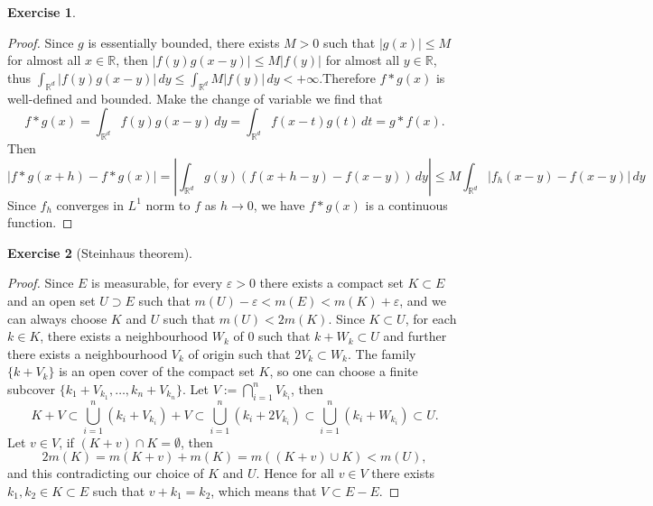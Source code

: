 \documentclass[a4paper]{article}
\newtheorem{ex}{Exercise}[subsection]
\begin{document}
\begin{ex}\end{ex}\begin{proof}
Since $g$ is essentially bounded, there exists $M > 0$ such that $|g(x)| \leq M$ for almost all $x \in \mathbb{R}$, 
then $|f(y)g(x - y)| \leq M|f(y)|$ for almost all $y \in \mathbb{R}$, thus $
\int_{\mathbb{R}^d}|f(y)g(x - y)|\,dy \leq \int_{\mathbb{R}^d}M|f(y)|\,dy < +\infty.
$Therefore $f * g(x)$ is well-defined and bounded. Make the change of variable we find that$$
f * g(x) = \int_{\mathbb{R}^d} f(y)g(x - y)\,dy = \int_{\mathbb{R}^d} f(x - t)g(t)\,dt = g * f(x).
$$Then$$
|f * g(x + h) - f * g(x)| = |\int_{\mathbb{R}^d}g(y)(f(x + h - y) - f(x - y))\,dy| \leq M\int_{\mathbb{R}^d}|f_h(x - y) - f(x - y)|\,dy
$$
Since $f_h$ converges in $L^1$ norm to $f$ as $h \to 0$, we have $f * g(x)$ is a continuous function.
\end{proof}

\begin{ex}[Steinhaus theorem]\end{ex}\begin{proof}
    Since $E$ is measurable, for every $\varepsilon > 0$ there exists a compact set $K \subset E$ and an open set 
    $U \supset E$ such that $m(U) - \varepsilon < m(E) < m(K) + \varepsilon$, and we can always choose $K$ and $U$
    such that $m(U) < 2m(K)$. Since $K \subset U$, for each $k \in K$, there exists a neighbourhood $W_k$ of 0 such
    that $k + W_k \subset U$ and further there exists a neighbourhood $V_k$ of origin such that $2V_k \subset W_k$.
    The family $\{k + V_k\}$ is an open cover of the compact set $K$, so one can choose a finite subcover 
    $\{k_1 + V_{k_1}, \dots, k_n + V_{k_n}\}$. Let $V := \bigcap_{i = 1}^n V_{k_i}$, then$$
    K + V \subset \bigcup_{i = 1}^n (k_i + V_{k_i}) + V \subset \bigcup_{i = 1}^n (k_i + 2V_{k_i}) \subset 
    \bigcup_{i = 1}^n (k_i + W_{k_i}) \subset U.
    $$Let $v \in V$, if $(K + v) \cap K = \emptyset$, then $$
    2m(K) = m(K + v) + m(K) = m((K + v) \cup K) < m(U),
    $$and this contradicting our choice of $K$ and $U$. Hence for all $v \in V$ there exists $k_1, k_2 \in K \subset E$
    such that $v + k_1 = k_2$, which means that $V \subset E - E$. 
\end{proof}
\end{document}
